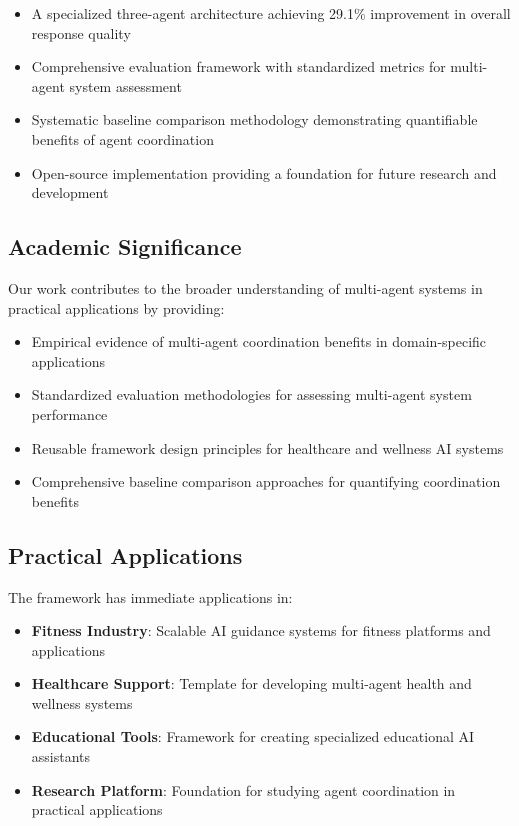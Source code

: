 \documentclass[conference]{IEEEtran}
\begin{document}
\begin{itemize}
\item A specialized three-agent architecture achieving 29.1\% improvement in overall response quality
\item Comprehensive evaluation framework with standardized metrics for multi-agent system assessment
\item Systematic baseline comparison methodology demonstrating quantifiable benefits of agent coordination
\item Open-source implementation providing a foundation for future research and development
\end{itemize}

\subsection{Academic Significance}

Our work contributes to the broader understanding of multi-agent systems in practical applications by providing:

\begin{itemize}
\item Empirical evidence of multi-agent coordination benefits in domain-specific applications
\item Standardized evaluation methodologies for assessing multi-agent system performance
\item Reusable framework design principles for healthcare and wellness AI systems
\item Comprehensive baseline comparison approaches for quantifying coordination benefits
\end{itemize}

\subsection{Practical Applications}

The framework has immediate applications in:

\begin{itemize}
\item \textbf{Fitness Industry}: Scalable AI guidance systems for fitness platforms and applications
\item \textbf{Healthcare Support}: Template for developing multi-agent health and wellness systems
\item \textbf{Educational Tools}: Framework for creating specialized educational AI assistants
\item \textbf{Research Platform}: Foundation for studying agent coordination in practical applications
\end{itemize}
\end{document}
